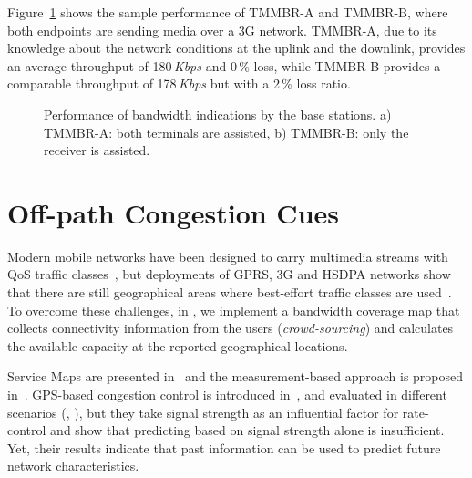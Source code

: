 Figure~\ref{fig:tmmbn} shows the sample performance of TMMBR-A and TMMBR-B,
where both endpoints are sending media over a 3G network. TMMBR-A, due to its
knowledge about the network conditions at the uplink and the downlink, provides
an average throughput of 180\,\emph{Kbps} and 0\,\% loss, while TMMBR-B provides a
comparable throughput of 178\,\emph{Kbps} but with a 2\,\% loss ratio.


\begin{figure}
  \centerline{
  }
  \caption{Performance of bandwidth indications by the base
  stations. a) TMMBR-A: both terminals are assisted, b) TMMBR-B: only the receiver
  is assisted.}
  \label{fig:tmmbn}
\end{figure}


\section{Off-path Congestion Cues}


Modern mobile networks have been designed to carry multimedia streams with QoS
traffic classes~\cite{3gpp.23.107}, but deployments of GPRS, 3G and HSDPA
networks show that there are still geographical areas where best-effort
traffic classes are used~\cite{Curcio:glass, 6012045}. To overcome these challenges, in
, we implement a bandwidth coverage map that collects
connectivity information from the users (\emph {crowd-sourcing}) and
calculates the available capacity at the reported geographical locations.

Service Maps are presented in~\cite{1630563} and the measurement-based
approach is proposed in~\cite{Aravinda:2008p14}. GPS-based congestion control
is introduced in~\cite{Yao:2008p21}, and evaluated in different
scenarios (\cite{Yao:2009p57}, \cite{Yao:2010p64}), but they take signal
strength as an influential factor for rate-control and show that predicting
based on signal strength alone is insufficient. Yet, their results indicate
that past information can be used to predict future network characteristics.

